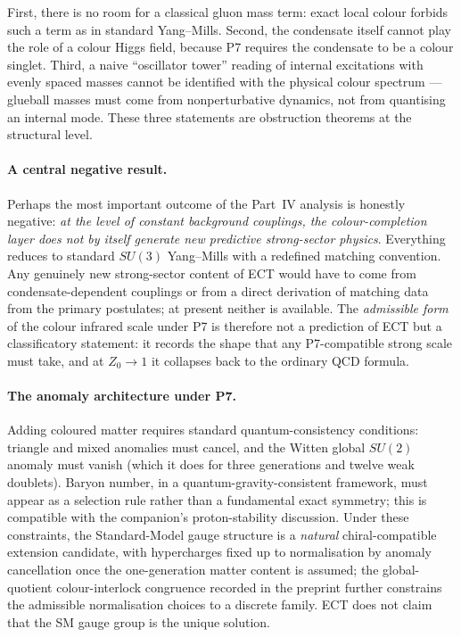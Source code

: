 \documentclass[11pt,a4paper]{article}
\begin{document}
First, there is no room for a classical gluon mass term: exact local colour forbids such a term as in standard Yang--Mills. Second, the condensate itself cannot play the role of a colour Higgs field, because P7 requires the condensate to be a colour singlet. Third, a naive ``oscillator tower'' reading of internal excitations with evenly spaced masses cannot be identified with the physical colour spectrum --- glueball masses must come from nonperturbative dynamics, not from quantising an internal mode. These three statements are obstruction theorems at the structural level.

\paragraph{A central negative result.} Perhaps the most important outcome of the Part~IV analysis is honestly negative: \emph{at the level of constant background couplings, the colour-completion layer does not by itself generate new predictive strong-sector physics}. Everything reduces to standard $SU(3)$ Yang--Mills with a redefined matching convention. Any genuinely new strong-sector content of ECT would have to come from condensate-dependent couplings or from a direct derivation of matching data from the primary postulates; at present neither is available. The \emph{admissible form} of the colour infrared scale under P7 is therefore not a prediction of ECT but a classificatory statement: it records the shape that any P7-compatible strong scale must take, and at $Z_0\to 1$ it collapses back to the ordinary QCD formula.

\paragraph{The anomaly architecture under P7.} Adding coloured matter requires standard quantum-consistency conditions: triangle and mixed anomalies must cancel, and the Witten global $SU(2)$ anomaly must vanish (which it does for three generations and twelve weak doublets). Baryon number, in a quantum-gravity-consistent framework, must appear as a selection rule rather than a fundamental exact symmetry; this is compatible with the companion's proton-stability discussion. Under these constraints, the Standard-Model gauge structure is a \emph{natural} chiral-compatible extension candidate, with hypercharges fixed up to normalisation by anomaly cancellation once the one-generation matter content is assumed; the global-quotient colour-interlock congruence recorded in the preprint further constrains the admissible normalisation choices to a discrete family. ECT does not claim that the SM gauge group is the unique solution.
\end{document}
